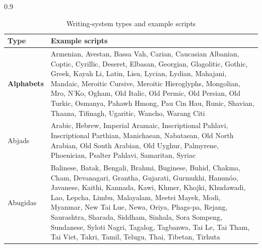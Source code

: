 \begin{table}[H]
	\centering
	\captionsetup{skip=0.5\DocDefaultBaselineSkip}%
	\caption{Writing-system types and example scripts}
	\label{tab:writing-system-types}
	\begingroup
	\setlength{\tabcolsep}{4pt}%
	\renewcommand{\arraystretch}{1.05}%

	\renewcommand{\tabularxcolumn}[1]{m{#1}}

	\begin{spacing}{0.9} %
		\footnotesize        %

		\begin{tabularx}{\textwidth}{|
				>{\raggedright\arraybackslash\bfseries}m{}|
				>{\raggedright\arraybackslash}X|
			}
			\hline
			Type & {\bfseries Example scripts} \\ \hline

			Alphabets &
			Armenian, Avestan, Bassa Vah, Carian, Caucasian Albanian, Coptic,
			Cyrillic, Deseret, Elbasan, Georgian, Glagolitic, Gothic, Greek,
			Kayah Li, Latin, Lisu, Lycian, Lydian, Mahajani, Mandaic,
			Meroitic Cursive, Meroitic Hieroglyphs, Mongolian, Mro, \mbox{N’Ko},
			Ogham, Old Italic, Old Permic, Old Persian, Old Turkic, Osmanya,
			Pahawh Hmong, Pau Cin Hau, Runic, Shavian, Thaana, Tifinagh,
			Ugaritic, Wancho, Warang Citi \\ \hline

			Abjads &
			Arabic, Hebrew, Imperial Aramaic, Inscriptional Pahlavi,
			Inscriptional Parthian, Manichaean, Nabataean, Old North Arabian,
			Old South Arabian, Old Uyghur, Palmyrene, Phoenician, Psalter
			Pahlavi, Samaritan, Syriac \\ \hline

			Abugidas &
			Balinese, Batak, Bengali, Brahmi, Buginese, Buhid, Chakma, Cham,
			Devanagari, Grantha, Gujarati, Gurmukhi, Hanunóo, Javanese,
			Kaithi, Kannada, Kawi, Khmer, Khojki, Khudawadi, Lao, Lepcha,
			Limbu, Malayalam, Meetei Mayek, Modi, Myanmar, New Tai Lue, Newa,
			Oriya, Phags-pa, Rejang, Saurashtra, Sharada, Siddham, Sinhala,
			Sora Sompeng, Sundanese, Syloti Nagri, Tagalog, Tagbanwa, Tai Le,
			Tai Tham, Tai Viet, Takri, Tamil, Telugu, Thai, Tibetan, Tirhuta
			\\ \hline


\end{tabularx}
\end{spacing}
\end{table}
